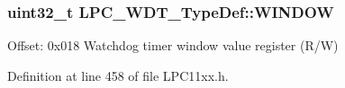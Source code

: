 \subsubsection[{\texorpdfstring{W\+I\+N\+D\+OW}{WINDOW}}]{ uint32\+\_\+t L\+P\+C\+\_\+\+W\+D\+T\+\_\+\+Type\+Def\+::\+W\+I\+N\+D\+OW}\hypertarget{group___l_p_c11xx___definitions_gac636e5c9a75e0818b102050ef7f5f23c}{}\label{group___l_p_c11xx___definitions_gac636e5c9a75e0818b102050ef7f5f23c}
Offset\+: 0x018 Watchdog timer window value register (R/W) 

Definition at line 458 of file L\+P\+C11xx.\+h.

